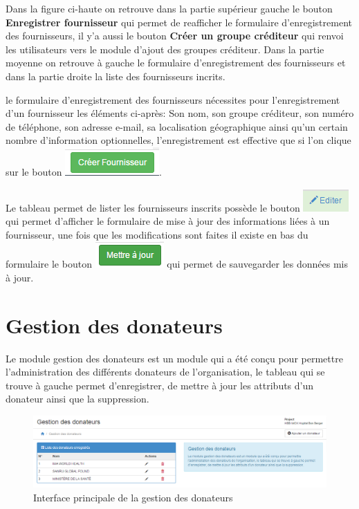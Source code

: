 \documentclass[12pt,a4paper]{report}
\begin{document}
Dans la figure ci-haute on retrouve dans la partie supérieur gauche le bouton \textbf{Enregistrer fournisseur} qui permet de reafficher le formulaire d'enregistrement des fournisseurs, il y'a aussi le bouton \textbf{Créer un groupe créditeur} qui renvoi les utilisateurs vers le module d'ajout des groupes créditeur. Dans la partie moyenne on retrouve à gauche le formulaire d'enregistrement des fournisseurs et dans la partie droite la liste des fournisseurs incrits.

le formulaire d'enregistrement des fournisseurs nécessites pour l'enregistrement d'un fournisseur les éléments ci-après: Son nom, son groupe créditeur, son numéro de téléphone, son adresse e-mail, sa localisation géographique ainsi qu'un certain nombre d'information optionnelles, l'enregistrement est effective que si l'on clique sur le bouton \includegraphics[scale=0.7]{pic/CreatSupplier.png}.

Le tableau permet de lister les fournisseurs inscrits possède le bouton \includegraphics[scale=0.7]{pic/EditSupplier.png} qui permet d'afficher le formulaire de mise à jour des informations liées à un fournisseur, une fois que les modifications sont faites il existe en bas du formulaire le bouton \includegraphics[scale=0.7]{pic/MettreJourSuppl.png} qui permet de sauvegarder les données mis à jour.
\newpage

\section{Gestion des donateurs}
Le module gestion des donateurs est un module qui a été conçu pour permettre l'administration des différents donateurs de l'organisation, le tableau qui se trouve à gauche permet d’enregistrer, de mettre à jour les attributs d'un donateur ainsi que la suppression.
\begin{figure}[h]
\begin{center}
\includegraphics[width=14cm]{pic/GestionDonateur.png}
\end{center}
\caption{Interface principale de la gestion des donateurs}
\label{Interface principale de la gestion des donateurs}
\end{figure}
\end{document}
